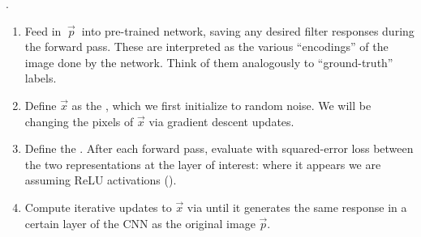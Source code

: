 \documentclass[11pt]{article}
\begin{document}
\myspace
\p {}. 
\begin{enumerate}
	\item Feed in  $~\vec{p}~$ into pre-trained network, saving any desired filter responses during the forward pass. These are interpreted as the various ``encodings'' of the image done by the network. Think of them analogously to ``ground-truth'' labels.
	
	\item Define $\vec x$ as the , which we first initialize to random noise. We will be changing the pixels of $\vec x$ via gradient descent updates. 
	
	\item Define the . After each forward pass, evaluate with squared-error loss between the two representations at the layer of interest:
	where it appears we are assuming ReLU activations ().
	
	\item Compute iterative updates to $\vec x$ via  until it generates the same response in a certain layer of the CNN as the original image $\vec p$. 
\end{enumerate}
\end{document}
